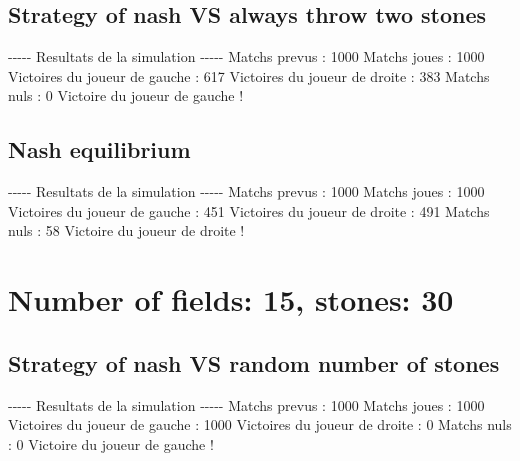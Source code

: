 \documentclass{article}%
\begin{document}
%
\subsection{Strategy of nash VS always throw two stones}%
\label{subsec:Strategy of nash VS always throw two stones}%
{-}{-}{-}{-}{-} Resultats de la simulation {-}{-}{-}{-}{-}\newline%
		\newline%
Matchs prevus : 1000\newline%
Matchs joues : 1000\newline%
\newline%
Victoires du joueur de gauche : 617\newline%
Victoires du joueur de droite : 383\newline%
Matchs nuls : 0\newline%
\newline%
Victoire du joueur de gauche !

%
\subsection{Nash equilibrium}%
\label{subsec:Nash equilibrium}%
{-}{-}{-}{-}{-} Resultats de la simulation {-}{-}{-}{-}{-}\newline%
		\newline%
Matchs prevus : 1000\newline%
Matchs joues : 1000\newline%
\newline%
Victoires du joueur de gauche : 451\newline%
Victoires du joueur de droite : 491\newline%
Matchs nuls : 58\newline%
\newline%
Victoire du joueur de droite !

%
\section{Number of fields: 15, stones: 30}%
\label{sec:Number of fields 15, stones 30}%
\subsection{Strategy of nash VS random number of stones}%
\label{subsec:Strategy of nash VS random number of stones}%
{-}{-}{-}{-}{-} Resultats de la simulation {-}{-}{-}{-}{-}\newline%
		\newline%
Matchs prevus : 1000\newline%
Matchs joues : 1000\newline%
\newline%
Victoires du joueur de gauche : 1000\newline%
Victoires du joueur de droite : 0\newline%
Matchs nuls : 0\newline%
\newline%
Victoire du joueur de gauche !
\end{document}
